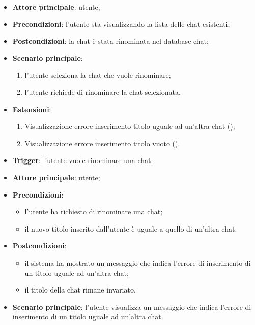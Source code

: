 \documentclass[10pt, a4paper]{article}
\begin{document}
    \begin{itemize}
        \item \textbf{Attore principale}: utente;
        \item \textbf{Precondizioni}: l’utente sta visualizzando la lista delle chat esistenti;
        \item \textbf{Postcondizioni}: la chat è stata rinominata nel database chat;
        \item \textbf{Scenario principale}:
        \begin{enumerate}
            \item l’utente seleziona la chat che vuole rinominare;
            \item l’utente richiede di rinominare la chat selezionata.
        \end{enumerate}
        \item \textbf{Estensioni}:
         \begin{enumerate}
            \item Visualizzazione errore inserimento titolo uguale ad un’altra chat ();
            \item Visualizzazione errore inserimento titolo vuoto ().
        \end{enumerate}
        \item \textbf{Trigger}: l’utente vuole rinominare una chat.
    \end{itemize}

    \begin{itemize}
        \item \textbf{Attore principale}: utente;
        \item \textbf{Precondizioni}: 
        \begin{itemize}
            \item l’utente ha richiesto di rinominare una chat;
            \item il nuovo titolo inserito dall'utente è uguale a quello di un'altra chat.
        \end{itemize}
        \item \textbf{Postcondizioni}: 
        \begin{itemize}
            \item il sistema ha mostrato un messaggio che indica l’errore di inserimento di un titolo uguale ad un’altra chat;
            \item il titolo della chat rimane invariato.
        \end{itemize}
        \item \textbf{Scenario principale}: l’utente visualizza un messaggio che indica l’errore di inserimento di un titolo uguale ad un’altra chat.
    \end{itemize}
\end{document}
